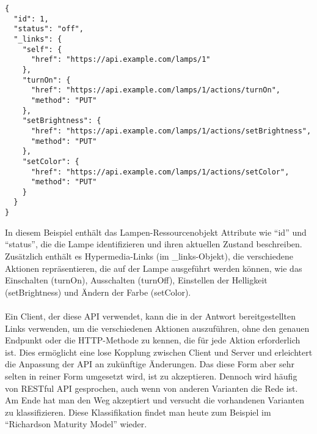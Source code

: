 \documentclass[../vs-script-first-v01.tex]{subfiles}
\begin{document}
\noindent\begin{minipage}{\textwidth}
\begin{lstlisting}[caption={HATEOAS Lampe},captionpos=b,label={lst:hateoas}]
{
  "id": 1,
  "status": "off",
  "_links": {
    "self": {
      "href": "https://api.example.com/lamps/1"
    },
    "turnOn": {
      "href": "https://api.example.com/lamps/1/actions/turnOn",
      "method": "PUT"
    },
    "setBrightness": {
      "href": "https://api.example.com/lamps/1/actions/setBrightness",
      "method": "PUT"
    },
    "setColor": {
      "href": "https://api.example.com/lamps/1/actions/setColor",
      "method": "PUT"
    }
  }
}
\end{lstlisting}
\end{minipage}
In diesem Beispiel enthält das Lampen-Ressourcenobjekt Attribute wie \enquote{id} und \enquote{status}, die die Lampe identifizieren und ihren aktuellen Zustand beschreiben. Zusätzlich enthält es Hypermedia-Links (im \_links-Objekt), die verschiedene Aktionen repräsentieren, die auf der Lampe ausgeführt werden können, wie das Einschalten (turnOn), Ausschalten (turnOff), Einstellen der Helligkeit (setBrightness) und Ändern der Farbe (setColor).
\\\\
Ein Client, der diese API verwendet, kann die in der Antwort bereitgestellten Links verwenden, um die verschiedenen Aktionen auszuführen, ohne den genauen Endpunkt oder die HTTP-Methode zu kennen, die für jede Aktion erforderlich ist. Dies ermöglicht eine lose Kopplung zwischen Client und Server und erleichtert die Anpassung der API an zukünftige Änderungen. Das diese Form aber sehr selten in reiner Form umgesetzt wird, ist zu akzeptieren. Dennoch wird häufig von RESTful API gesprochen, auch wenn von anderen Varianten die Rede ist. Am Ende hat man den Weg akzeptiert und versucht die vorhandenen Varianten zu klassifizieren. Diese Klassifikation findet man heute zum Beispiel im \enquote{Richardson Maturity Model} wieder. 
\end{document}
